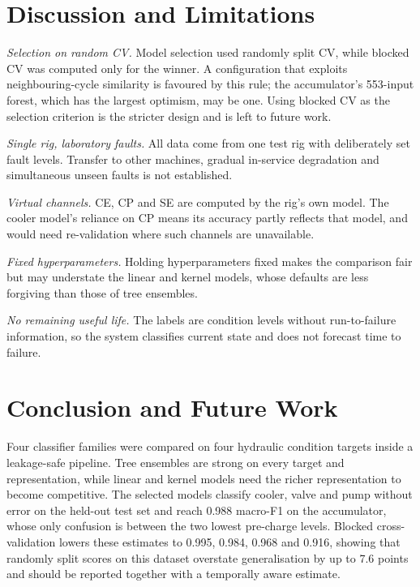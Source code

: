 \documentclass[conference]{IEEEtran}
\begin{document}
\section{Discussion and Limitations}
\textit{Selection on random CV.} Model selection used randomly split CV, while
blocked CV was computed only for the winner. A configuration that exploits
neighbouring-cycle similarity is favoured by this rule; the accumulator's
553-input forest, which has the largest optimism, may be one. Using blocked CV
as the selection criterion is the stricter design and is left to future work.

\textit{Single rig, laboratory faults.} All data come from one test rig with
deliberately set fault levels. Transfer to other machines, gradual in-service
degradation and simultaneous unseen faults is not established.

\textit{Virtual channels.} CE, CP and SE are computed by the rig's own model.
The cooler model's reliance on CP means its accuracy partly reflects that
model, and would need re-validation where such channels are unavailable.

\textit{Fixed hyperparameters.} Holding hyperparameters fixed makes the
comparison fair but may understate the linear and kernel models, whose
defaults are less forgiving than those of tree ensembles.

\textit{No remaining useful life.} The labels are condition levels without
run-to-failure information, so the system classifies current state and does
not forecast time to failure.

\section{Conclusion and Future Work}
Four classifier families were compared on four hydraulic condition targets
inside a leakage-safe pipeline. Tree ensembles are strong on every target and
representation, while linear and kernel models need the richer representation
to become competitive. The selected models classify cooler, valve and pump
without error on the held-out test set and reach 0.988 macro-F1 on the
accumulator, whose only confusion is between the two lowest pre-charge levels.
Blocked cross-validation lowers these estimates to 0.995, 0.984, 0.968 and
0.916, showing that randomly split scores on this dataset overstate
generalisation by up to 7.6 points and should be reported together with a
temporally aware estimate.
\end{document}
